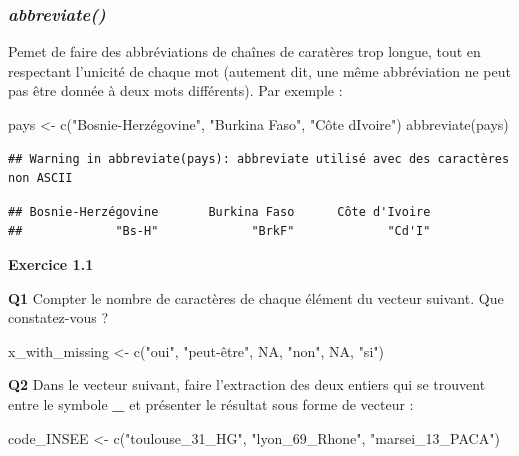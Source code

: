 \documentclass[
]{book}
\newenvironment{Shaded}{\begin{snugshade}}{\end{snugshade}}
\newcommand{\ConstantTok}[1]{\textcolor[rgb]{0.00,0.00,0.00}{#1}}
\newcommand{\FunctionTok}[1]{\textcolor[rgb]{0.00,0.00,0.00}{#1}}
\newcommand{\NormalTok}[1]{#1}
\newcommand{\OtherTok}[1]{\textcolor[rgb]{0.56,0.35,0.01}{#1}}
\newcommand{\StringTok}[1]{\textcolor[rgb]{0.31,0.60,0.02}{#1}}
\theoremstyle{definition}
\theoremstyle{definition}
\theoremstyle{definition}
\theoremstyle{definition}
\theoremstyle{remark}
\begin{document}
\hypertarget{abbreviate}{%
\subsubsection{\texorpdfstring{\emph{abbreviate()}}{abbreviate()}}\label{abbreviate}}

Pemet de faire des abbréviations de chaînes de caratères trop longue, tout en respectant l'unicité de chaque mot (autement dit, une même abbréviation ne peut pas être donnée à deux mots différents). Par exemple :

\begin{Shaded}
\begin{Highlighting}[]
\NormalTok{pays }\OtherTok{\textless{}{-}} \FunctionTok{c}\NormalTok{(}\StringTok{"Bosnie{-}Herzégovine"}\NormalTok{, }\StringTok{"Burkina Faso"}\NormalTok{,  }\StringTok{"Côte d\textquotesingle{}Ivoire"}\NormalTok{)}
\FunctionTok{abbreviate}\NormalTok{(pays)}
\end{Highlighting}
\end{Shaded}

\begin{verbatim}
## Warning in abbreviate(pays): abbreviate utilisé avec des caractères non ASCII
\end{verbatim}

\begin{verbatim}
## Bosnie-Herzégovine       Burkina Faso      Côte d'Ivoire 
##             "Bs-H"             "BrkF"             "Cd'I"
\end{verbatim}

\textbf{Exercice 1.1}

\textbf{Q1} Compter le nombre de caractères de chaque élément du vecteur suivant. Que constatez-vous ?

\begin{Shaded}
\begin{Highlighting}[]
\NormalTok{x\_with\_missing }\OtherTok{\textless{}{-}} \FunctionTok{c}\NormalTok{(}\StringTok{"oui"}\NormalTok{, }\StringTok{"peut{-}être"}\NormalTok{, }\ConstantTok{NA}\NormalTok{, }\StringTok{"non"}\NormalTok{, }\ConstantTok{NA}\NormalTok{, }\StringTok{"si"}\NormalTok{)}
\end{Highlighting}
\end{Shaded}

\textbf{Q2} Dans le vecteur suivant, faire l'extraction des deux entiers qui se trouvent entre le symbole \textbf{\_} et présenter le résultat sous forme de vecteur :

\begin{Shaded}
\begin{Highlighting}[]
\NormalTok{code\_INSEE }\OtherTok{\textless{}{-}} \FunctionTok{c}\NormalTok{(}\StringTok{"toulouse\_31\_HG"}\NormalTok{, }\StringTok{"lyon\_69\_Rhone"}\NormalTok{,}
                \StringTok{"marsei\_13\_PACA"}\NormalTok{)}
\end{Highlighting}
\end{Shaded}
\end{document}
